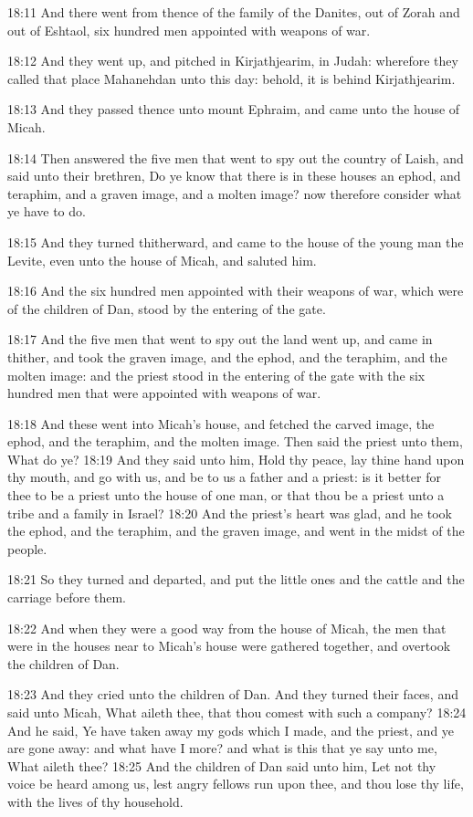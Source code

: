 18:11 And there went from thence of the family of the Danites, out of
Zorah and out of Eshtaol, six hundred men appointed with weapons of
war.

18:12 And they went up, and pitched in Kirjathjearim, in Judah:
wherefore they called that place Mahanehdan unto this day: behold, it
is behind Kirjathjearim.

18:13 And they passed thence unto mount Ephraim, and came unto the
house of Micah.

18:14 Then answered the five men that went to spy out the country of
Laish, and said unto their brethren, Do ye know that there is in these
houses an ephod, and teraphim, and a graven image, and a molten image?
now therefore consider what ye have to do.

18:15 And they turned thitherward, and came to the house of the young
man the Levite, even unto the house of Micah, and saluted him.

18:16 And the six hundred men appointed with their weapons of war,
which were of the children of Dan, stood by the entering of the gate.

18:17 And the five men that went to spy out the land went up, and came
in thither, and took the graven image, and the ephod, and the
teraphim, and the molten image: and the priest stood in the entering
of the gate with the six hundred men that were appointed with weapons
of war.

18:18 And these went into Micah's house, and fetched the carved image,
the ephod, and the teraphim, and the molten image. Then said the
priest unto them, What do ye?  18:19 And they said unto him, Hold thy
peace, lay thine hand upon thy mouth, and go with us, and be to us a
father and a priest: is it better for thee to be a priest unto the
house of one man, or that thou be a priest unto a tribe and a family
in Israel?  18:20 And the priest's heart was glad, and he took the
ephod, and the teraphim, and the graven image, and went in the midst
of the people.

18:21 So they turned and departed, and put the little ones and the
cattle and the carriage before them.

18:22 And when they were a good way from the house of Micah, the men
that were in the houses near to Micah's house were gathered together,
and overtook the children of Dan.

18:23 And they cried unto the children of Dan. And they turned their
faces, and said unto Micah, What aileth thee, that thou comest with
such a company?  18:24 And he said, Ye have taken away my gods which I
made, and the priest, and ye are gone away: and what have I more? and
what is this that ye say unto me, What aileth thee?  18:25 And the
children of Dan said unto him, Let not thy voice be heard among us,
lest angry fellows run upon thee, and thou lose thy life, with the
lives of thy household.

